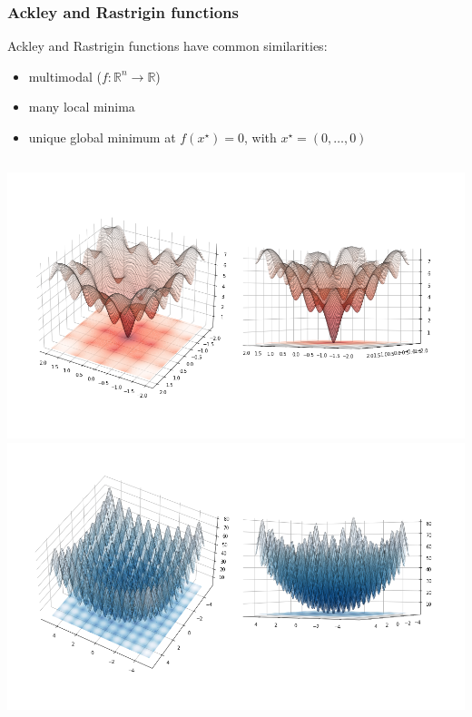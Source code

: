\documentclass{beamer}
\begin{document}
\begin{frame}
\frametitle{Ackley and Rastrigin functions}
Ackley and Rastrigin functions have common similarities:
  \begin{itemize}
    \item multimodal ($f:\mathbb{R}^n \rightarrow \mathbb{R}$)
    \item many local minima
    \item unique global minimum at $f(x^{\star}) = 0$, with $x^{\star} = (0, \dots, 0)$
  \end{itemize}
  \begin{columns}[t]
      \centering
      \includegraphics[width=1.0\textwidth]{figures/introduction-ackley}
      \centering
      \includegraphics[width=1.0\textwidth]{figures/introduction-rastrigin}
  \end{columns}
\end{frame}
\end{document}
